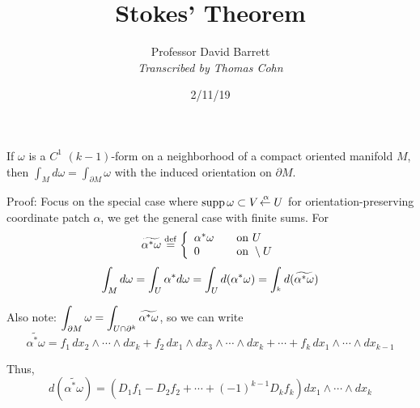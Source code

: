 \documentclass[10pt,letterpaper]{article}
\author{Professor David Barrett\\ \small\textit{Transcribed by Thomas Cohn}}
\title{Stokes' Theorem}
\date{2/11/19} %
\newcommand{\n}{\hfill\break}
\newcommand{\ptxt}[1]{\textrm{\textnormal{#1}}}
\newcommand{\halfPlane}{\mathbb{H}}
\let\H\relax
\newcommand{\H}{\halfPlane}
\newcommand{\cut}{\setminus}
\DeclareMathOperator{\supp}{supp}
\newcommand{\eqdef}{\overset{\ptxt{def}}{=}}
\newcommand{\from}{\!\mathrel{\reflectbox{\ensuremath{\to}}}}
\begin{document}
\maketitle
\setlength\RaggedRightParindent{\parindent}
\RaggedRight

\par\noindent If $\omega$ is a $C^{1}$ $(k-1)$-form on a neighborhood of a compact oriented manifold $M$, then $\int_{M}d\omega=\int_{\partial{}M}\omega$ with the induced orientation on $\partial{}M$.\n

\par\noindent Proof: Focus on the special case where $\supp\omega\subset{}V\overset{\alpha}{\from}U$ for orientation-preserving coordinate patch $\alpha$, we get the general case with finite sums. For
\[
\widetilde{\alpha^{*}\omega}\eqdef\left\{\begin{array}{ll}\alpha^{*}\omega & \quad\ptxt{on }U\\ 0 & \quad\ptxt{on }\H\cut{}U\end{array}\right.
\]
\[
\int_{M}d\omega=\int_{U}\alpha^{*}d\omega=\int_{U}d(\alpha^{*}\omega)=\int_{\H^{k}}d(\widetilde{\alpha^{*}\omega})
\]

\par\noindent Also note: $\displaystyle\int_{\partial{}M}\omega=\int_{U\cap\partial\H^{k}}\widetilde{\alpha^{*}\omega}$, so we can write\n
\[
\widetilde{\alpha^{*}\omega}=f_{1}\,dx_{2}\wedge\cdots\wedge{}dx_{k}+f_{2}\,dx_{1}\wedge{}dx_{3}\wedge\cdots\wedge{}dx_{k}+\cdots+f_{k}\,dx_{1}\wedge\cdots\wedge{}dx_{k-1}
\]

\par\noindent Thus,
\[
d(\widetilde{\alpha^{*}\omega})=(D_{1}f_{1}-D_{2}f_{2}+\cdots+(-1)^{k-1}D_{k}f_{k})dx_{1}\wedge\cdots\wedge{}dx_{k}
\]
\end{document}
